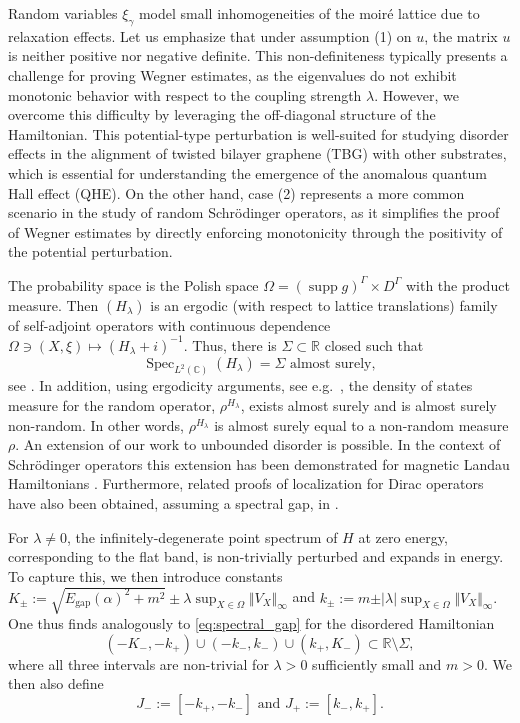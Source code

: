 \documentclass[reqno,12pt,letterpaper]{amsart}
\newcommand{\CC}{{\mathbb C}}
\numberwithin{equation}{section}
\DeclareMathOperator{\Spec}{Spec}
\DeclareMathOperator{\supp}{supp}
\begin{document}
Random variables $\xi_{\gamma}$ model small inhomogeneities of the moir\'e lattice due to relaxation effects. 
Let us emphasize that under assumption (1) on $u$, the matrix $u$ is neither positive nor negative definite. This non-definiteness typically presents a challenge for proving Wegner estimates, as the eigenvalues do not exhibit monotonic behavior with respect to the coupling strength $\lambda$. However, we overcome this difficulty by leveraging the off-diagonal structure of the Hamiltonian. This potential-type perturbation is well-suited for studying disorder effects in the alignment of twisted bilayer graphene (TBG) with other substrates, which is essential for understanding the emergence of the anomalous quantum Hall effect (QHE). On the other hand, case (2) represents a more common scenario in the study of random Schrödinger operators, as it simplifies the proof of Wegner estimates by directly enforcing monotonicity through the positivity of the potential perturbation.

The probability space is the Polish space $\Omega = (\supp g)^{\Gamma} \times D^{\Gamma}$ with the product measure. Then $(H_{\lambda})$ is an ergodic (with respect to lattice translations) family of self-adjoint operators with continuous dependence $\Omega \ni (X,\xi) \mapsto (H_{\lambda}+i)^{-1}.$ 
Thus, there is $\Sigma \subset \mathbb R$ closed such that
\begin{equation}
\label{eq:Kirsch_inclusion}
\Spec_{L^2(\CC)}(H_{\lambda}) = \Sigma \text{ almost surely},
\end{equation} see \cite{KS80,KM82,Pa}. In addition, using ergodicity arguments, see e.g.\ \cite{W}, the density of states measure for the random operator, $\rho^{H_{\lambda}}$, exists almost surely and is almost surely non-random. In other words, $\rho^{H_{\lambda}}$ is almost surely equal to a non-random measure $\rho.$ 
An extension of our work to unbounded disorder is possible. In the context of Schr\"odinger operators this extension has been demonstrated for magnetic Landau Hamiltonians \cite{GKS2,GKM}. Furthermore, related proofs of localization for Dirac operators have also been obtained, assuming a spectral gap, in \cite{BCZ19}.



For $\lambda \neq 0$, the infinitely-degenerate point spectrum of $H$ at zero energy, corresponding to the flat band, is non-trivially perturbed and expands in energy. To capture this, we then introduce constants $K_{\pm} := \sqrt{E_{\operatorname{gap}}(\alpha)^2+m^2} \pm \lambda \sup_{X \in \Omega}  \Vert V_X \Vert_{\infty}$ and $k_{\pm}:= m \pm \vert \lambda \vert \sup_{X \in \Omega}  \Vert V_X \Vert_{\infty}.$
One thus finds analogously to \eqref{eq:spectral_gap} for the disordered Hamiltonian
\begin{equation}
\label{eq:random_spec}
 (-K_-,-k_+) \cup (-k_-,k_-) \cup (k_+,K_-) \subset \mathbb R \setminus \Sigma,
 \end{equation}
where all three intervals are non-trivial for $\lambda>0$ sufficiently small and $m >0$.
We then also define 
\begin{equation}
\label{eq:ivals}
J_-:=[-k_+,-k_-]\text{ and }J_+:=[k_-,k_+].
\end{equation}
\end{document}
